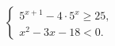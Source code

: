 \begin{ex}
	\begin{condition}
		\( \left\{
		\begin{array}{l}
			5^{x+1}-4\cdot5^x\geq25,\\
			x^2-3x-18<0.
		\end{array}
		\right. \)
	\end{condition}
	\answer{\( [2;6) \)}
\end{ex}